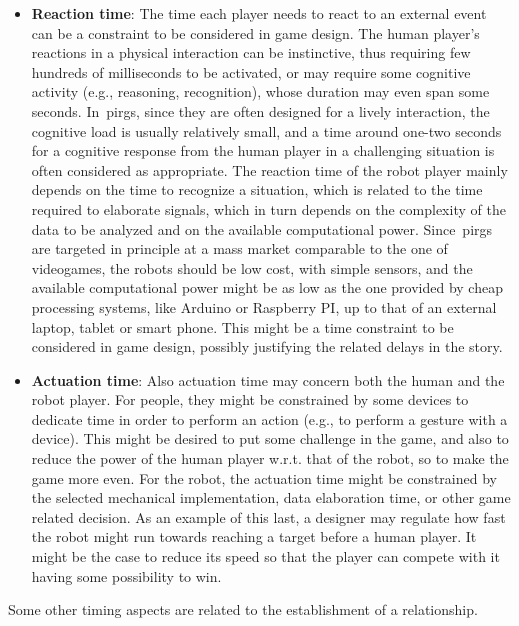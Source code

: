 \begin{itemize}
\item \textbf{Reaction time}: The time each player needs to react to an external event can be a constraint to be considered in game design. The human player's reactions in a physical interaction can be instinctive, thus requiring few hundreds of milliseconds to be activated, or may require some cognitive activity (e.g., reasoning, recognition), whose duration may even span some seconds. In~\glspl{pirg}, since they are often designed for a lively interaction, the cognitive load is usually relatively small, and a time around one-two seconds for a cognitive response from the human player in a challenging situation is often considered as appropriate. The reaction time of the robot player mainly depends on the time to recognize a situation, which is related to the time required to elaborate signals, which in turn depends on the complexity of the data to be analyzed and on the available computational power. Since~\glspl{pirg} are targeted in principle at a mass market comparable to the one of videogames, the robots should be low cost, with simple sensors, and the available computational power might be as low as the one provided by cheap processing systems, like Arduino or Raspberry PI, up to that of an external laptop, tablet or smart phone. This might be a time constraint to be considered in game design, possibly justifying the related delays in the story.

\item \textbf{Actuation time}: Also actuation time may concern both the human and the robot player. For people, they might be constrained by some devices to dedicate time in order to perform an action (e.g., to perform a gesture with a device). This might be desired to put some challenge in the game, and also to reduce the power of the human player w.r.t. that of the robot, so to make the game more even. For the robot, the actuation time might be constrained by the selected mechanical implementation, data elaboration time, or other game related decision. As an example of this last, a designer may regulate how fast the robot might run towards reaching a target before a human player. It might be the case to reduce its speed so that the player can compete with it having some possibility to win.
\end{itemize}

Some other timing aspects are related to the establishment of a relationship.

